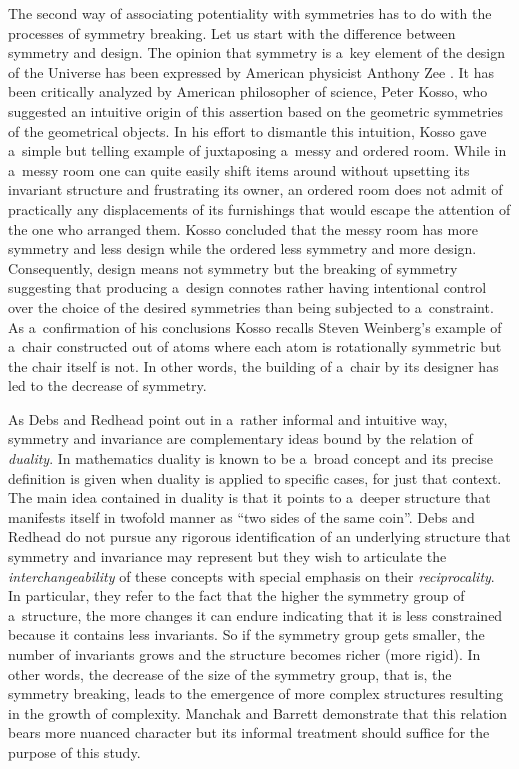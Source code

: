 The second way of associating potentiality with symmetries has to do with the processes of symmetry breaking. Let us start with the difference between symmetry and design. The opinion that symmetry is a~key element of the design of the Universe has been expressed by American physicist Anthony Zee 
\parencite*[][pp.3]{}. %
 It has been critically analyzed by American philosopher of science, Peter Kosso, who suggested an intuitive origin of this assertion based on the geometric symmetries of the geometrical objects. In his effort to dismantle this intuition, Kosso 
\parencite*[][p.421]{brading_symmetry_2003} %
 gave a~simple but telling example of juxtaposing a~messy and ordered room. While in a~messy room one can quite easily shift items around without upsetting its invariant structure and frustrating its owner, an ordered room does not admit of practically any displacements of its furnishings that would escape the attention of the one who arranged them. Kosso concluded that the messy room has more symmetry and less design while the ordered less symmetry and more design. Consequently, design means not symmetry but the breaking of symmetry suggesting that producing a~design connotes rather having intentional control over the choice of the desired symmetries than being subjected to a~constraint. As a~confirmation of his conclusions Kosso recalls Steven Weinberg's example of a~chair constructed out of atoms where each atom is rotationally symmetric but the chair itself is not. In other words, the building of a~chair by its designer has led to the decrease of symmetry.



As Debs and Redhead 
\parencite*[][pp.37–39]{} %
 point out in a~rather informal and intuitive way, symmetry and invariance are complementary ideas bound by the relation of \textit{duality}. In mathematics duality is known to be a~broad concept and its precise definition is given when duality is applied to specific cases, for just that context. The main idea contained in duality is that it points to a~deeper structure that manifests itself in twofold manner as ``two sides of the same coin''. Debs and Redhead do not pursue any rigorous identification of an underlying structure that symmetry and invariance may represent but they wish to articulate the \textit{interchangeability} of these concepts with special emphasis on their \textit{reciprocality}. In particular, they refer to the fact that the higher the symmetry group of a~structure, the more changes it can endure indicating that it is less constrained because it contains less invariants. So if the symmetry group gets smaller, the number of invariants grows and the structure becomes richer (more rigid). In other words, the decrease of the size of the symmetry group, that is, the symmetry breaking, leads to the emergence of more complex structures resulting in the growth of complexity. Manchak and Barrett 
\parencite*[][]{} %
 demonstrate that this relation bears more nuanced character but its informal treatment should suffice for the purpose of this study.



